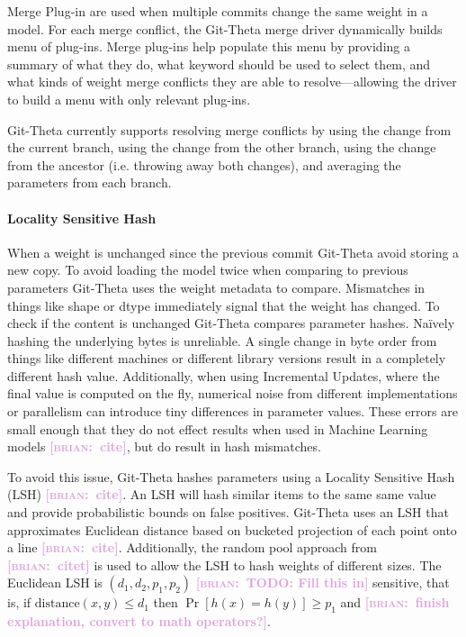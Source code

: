\documentclass[nohyperref]{article}
\theoremstyle{plain}
\theoremstyle{definition}
\theoremstyle{remark}
\newcommand{\brian}[1]{\textcolor{Plum}{\bf\small [\textsc{brian}:~#1]}}
\begin{document}
Merge Plug-in are used when multiple commits change the same weight in a model. For each merge conflict, the Git-Theta merge driver dynamically builds menu of plug-ins. Merge plug-ins help populate this menu by providing a summary of what they do, what keyword should be used to select them, and what kinds of weight merge conflicts they are able to resolve---allowing the driver to build a menu with only relevant plug-ins.

Git-Theta currently supports resolving merge conflicts by using the change from the current branch, using the change from the other branch, using the change from the ancestor (i.e. throwing away both changes), and averaging the parameters from each branch.


\paragraph{Locality Sensitive Hash}
\label{sec:LSH}

When a weight is unchanged since the previous commit Git-Theta avoid storing a new copy. To avoid loading the model twice when comparing to previous parameters Git-Theta uses the weight metadata to compare. Mismatches in things like shape or dtype immediately signal that the weight has changed. To check if the content is unchanged Git-Theta compares parameter hashes. Na\"{i}vely hashing the underlying bytes is unreliable. A single change in byte order from things like different machines or different library versions result in a completely different hash value. Additionally, when using Incremental Updates, where the final value is computed on the fly, numerical noise from different implementations or parallelism can introduce tiny differences in parameter values. These errors are small enough that they do not effect results when used in Machine Learning models \brian{cite}, but do result in hash mismatches.

To avoid this issue, Git-Theta hashes parameters using a Locality Sensitive Hash (LSH) \brian{cite}. An LSH will hash similar items to the same same value and provide probabilistic bounds on false positives. Git-Theta uses an LSH that approximates Euclidean distance based on bucketed projection of each point onto a line \brian{cite}. Additionally, the random pool approach from \brian{citet} is used to allow the LSH to hash weights of different sizes. The Euclidean LSH is $(d_1, d_2, p_1, p_2)$ \brian{TODO: Fill this in} sensitive, that is, if $\text{distance}(x, y) \leq d_1$ then $\Pr[h(x) = h(y)] \geq p_1$ and \brian{finish explanation, convert to math operators?}.
\end{document}
